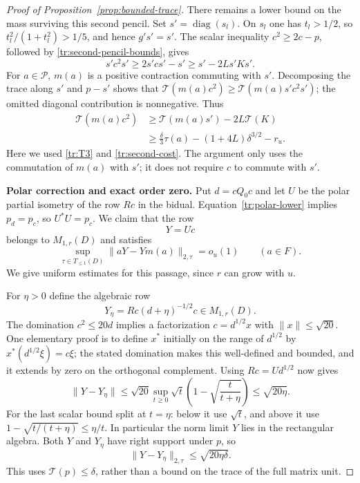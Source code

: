 \begin{proof}[Proof of Proposition~\ref{prop:bounded-trace}]
There remains a lower bound on the mass surviving this second pencil.
Set $s'=\operatorname{diag}(s_l)$.  On $s_l$ one has $t_l>1/2$,
so $t_l^2/(1+t_l^2)>1/5$, and hence $g's'=s'$.
The scalar inequality $c^2\geq2c-p$, followed by
\eqref{tr:second-pencil-bounds}, gives
\[
 s'c^2s'\geq2s'cs'-s'\geq s'-2Ls'Ks'.
\]
For $a\in\mathcal P$, $m(a)$ is a positive contraction commuting with
$s'$.  Decomposing the trace along $s'$ and $p-s'$ shows that
$\mathcal T(m(a)c^2)\geq\mathcal T(m(a)s'c^2s')$;
the omitted diagonal contribution is nonnegative.  Thus
\begin{align}
 \mathcal T(m(a)c^2)
 &\geq\mathcal T(m(a)s')-2L\mathcal T(K)\nonumber\\
 &\geq\frac\delta3\tau(a)-(1+4L)\delta^{3/2}-r_u.
 \label{tr:corrected-mass}
\end{align}
Here we used \eqref{tr:T3} and \eqref{tr:second-cost}.  The argument
only uses the commutation of $m(a)$ with $s'$; it does not require
$c$ to commute with $s'$.

\medskip\noindent
\textbf{Polar correction and exact order zero.}
Put $d=cQ_0c$ and let $U$ be the polar partial isometry of the row $Rc$
in the bidual.  Equation~\eqref{tr:polar-lower} implies
$p_d=p_c$, so $U^*U=p_c$.  We claim that the row
\[
 Y=Uc
\]
belongs to $M_{1,r}(D)$ and satisfies
\begin{equation}\label{tr:polar-intertwining}
 \sup_{\tau\in T_{\leq1}(D)}\|aY-Ym(a)\|_{2,\tau}=o_u(1)
 \qquad(a\in F).
\end{equation}
We give uniform estimates for this passage, since $r$ can grow with $u$.

For $\eta>0$ define the algebraic row
\[
 Y_\eta=Rc(d+\eta)^{-1/2}c\in M_{1,r}(D).
\]
The domination $c^2\leq20d$ implies a factorization
$c=d^{1/2}x$ with $\|x\|\leq\sqrt{20}$.  One elementary proof is to
define $x^*$ initially on the range of $d^{1/2}$ by
$x^*(d^{1/2}\xi)=c\xi$; the stated domination makes this well-defined
and bounded, and it extends by zero on the orthogonal complement.
Using $Rc=Ud^{1/2}$ now gives
\begin{equation}\label{tr:uniform-polar-norm}
 \|Y-Y_\eta\|
 \leq\sqrt{20}\sup_{t\geq0}
        \sqrt t\left(1-\sqrt{\frac{t}{t+\eta}}\right)
 \leq\sqrt{20\eta}.
\end{equation}
For the last scalar bound split at $t=\eta$: below it use $\sqrt t$,
and above it use
$1-\sqrt{t/(t+\eta)}\leq\eta/t$.
In particular the norm limit $Y$ lies in the rectangular algebra.
Both $Y$ and $Y_\eta$ have right support under $p$, so
\begin{equation}\label{tr:uniform-polar-two}
 \|Y-Y_\eta\|_{2,\tau}\leq\sqrt{20\eta\delta}.
\end{equation}
This uses $\mathcal T(p)\leq\delta$, rather than a bound on the trace
of the full matrix unit.


\end{proof}
